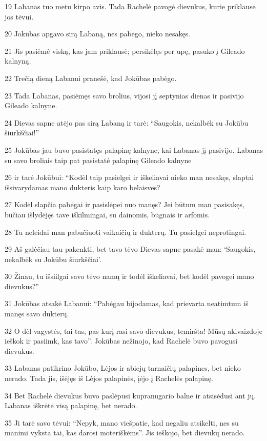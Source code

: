 \par 19 Labanas tuo metu kirpo avis. Tada Rachelė pavogė dievukus, kurie priklausė jos tėvui. 
\par 20 Jokūbas apgavo sirą Labaną, nes pabėgo, nieko nesakęs. 
\par 21 Jis pasiėmė viską, kas jam priklausė; persikėlęs per upę, pasuko į Gileado kalnyną. 
\par 22 Trečią dieną Labanui pranešė, kad Jokūbas pabėgo. 
\par 23 Tada Labanas, pasiėmęs savo brolius, vijosi jį septynias dienas ir pasivijo Gileado kalnyne. 
\par 24 Dievas sapne atėjo pas sirą Labaną ir tarė: “Saugokis, nekalbėk su Jokūbu šiurkščiai!” 
\par 25 Jokūbas jau buvo pasistatęs palapinę kalnyne, kai Labanas jį pasivijo. Labanas su savo broliais taip pat pasistatė palapinę Gileado kalnyne 
\par 26 ir tarė Jokūbui: “Kodėl taip pasielgei ir iškeliavai nieko man nesakęs, slaptai išsivarydamas mano dukteris kaip karo belaisves? 
\par 27 Kodėl slapčia pabėgai ir pasislėpei nuo manęs? Jei būtum man pasisakęs, būčiau išlydėjęs tave iškilmingai, su dainomis, būgnais ir arfomis. 
\par 28 Tu neleidai man pabučiuoti vaikaičių ir dukterų. Tu pasielgei neprotingai. 
\par 29 Aš galėčiau tau pakenkti, bet tavo tėvo Dievas sapne pasakė man: ‘Saugokis, nekalbėk su Jokūbu šiurkščiai’. 
\par 30 Žinau, tu išsiilgai savo tėvo namų ir todėl iškeliavai, bet kodėl pavogei mano dievukus?” 
\par 31 Jokūbas atsakė Labanui: “Pabėgau bijodamas, kad prievarta neatimtum iš manęs savo dukterų. 
\par 32 O dėl vagystės, tai tas, pas kurį rasi savo dievukus, temiršta! Mūsų akivaizdoje ieškok ir pasiimk, kas tavo”. Jokūbas nežinojo, kad Rachelė buvo pavogusi dievukus. 
\par 33 Labanas patikrino Jokūbo, Lėjos ir abiejų tarnaičių palapines, bet nieko nerado. Tada jis, išėjęs iš Lėjos palapinės, įėjo į Rachelės palapinę. 
\par 34 Bet Rachelė dievukus buvo paslėpusi kupranugario balne ir atsisėdusi ant jų. Labanas iškrėtė visą palapinę, bet nerado. 
\par 35 Ji tarė savo tėvui: “Nepyk, mano viešpatie, kad negaliu atsikelti, nes su manimi vyksta tai, kas darosi moteriškėms”. Jis ieškojo, bet dievukų nerado. 
